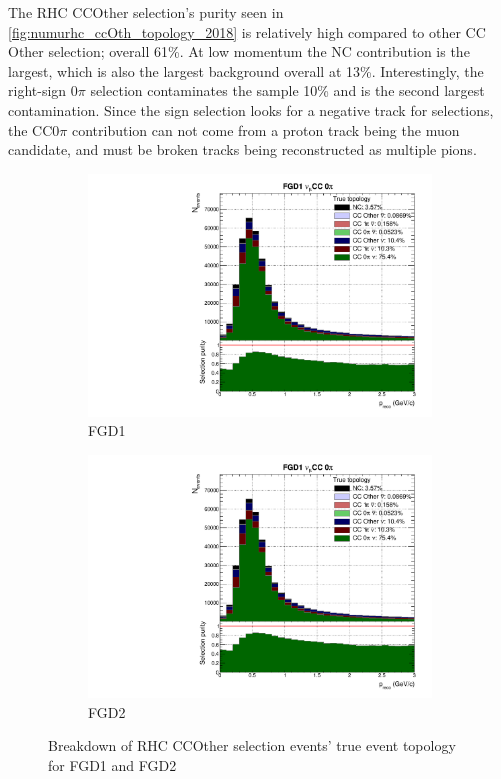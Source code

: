 The \numu RHC CCOther selection's purity seen in \autoref{fig:numurhc_ccOth_topology_2018} is relatively high compared to other CC Other selection; overall 61\%. At low momentum the NC contribution is the largest, which is also the largest background overall at 13\%. Interestingly, the right-sign 0$\pi$ selection contaminates the sample 10\% and is the second largest contamination. Since the sign selection looks for a negative track for \numu selections, the CC0$\pi$ contribution can not come from a proton track being the muon candidate, and must be broken tracks being reconstructed as multiple pions.
\begin{figure}[h]
	\begin{subfigure}[t]{0.49\textwidth}
		\includegraphics[width=\textwidth,page=29, trim={0mm 0mm 0mm 9mm}, clip]{figures/mach3/2018/Selection/2018_RedNDmatrix_rebin_verbose_may_noweights_diagnostics}
		\caption{FGD1}
	\end{subfigure}
	\begin{subfigure}[t]{0.49\textwidth}
		\includegraphics[width=\textwidth,page=35, trim={0mm 0mm 0mm 9mm}, clip]{figures/mach3/2018/Selection/2018_RedNDmatrix_rebin_verbose_may_noweights_diagnostics}
		\caption{FGD2}
	\end{subfigure}
	\caption{Breakdown of \numu RHC CCOther selection events' true event topology for FGD1 and FGD2 }
	\label{fig:numurhc_ccOth_topology_2018}
\end{figure}

